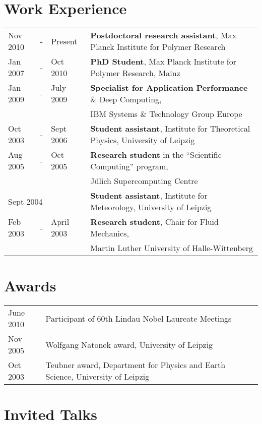 \documentclass{article}
\begin{document}
\section*{Work Experience}
\begin{tabular}{lcll}
Nov 2010 &-& Present & \textbf{Postdoctoral research assistant}, Max Planck Institute for Polymer Research\\
Jan 2007 &-& Oct 2010 & \textbf{PhD Student}, Max Planck Institute for Polymer Research, Mainz\\
Jan 2009 &-& July 2009 & \textbf{Specialist for Application Performance} \& Deep Computing,\\
&&&IBM Systems \& Technology Group Europe \\
Oct 2003 &-& Sept 2006 & \textbf{Student assistant}, Institute for Theoretical Physics, University of Leipzig \\
Aug 2005 &-& Oct 2005 & \textbf{Research student} in the ``Scientific Computing'' program,\\
&&& J{\"u}lich Supercomputing Centre \\
\multicolumn{3}{l}{Sept 2004} & \textbf{Student assistant}, Institute for Meteorology, University of Leipzig \\
Feb 2003 &-& April 2003 & \textbf{Research student}, Chair for Fluid Mechanics,\\
&&&Martin Luther University of Halle-Wittenberg \\
\end{tabular}

\section*{Awards}

\begin{tabular}{ll}
June 2010 & Participant of 60th Lindau Nobel Laureate Meetings\\
Nov 2005  & Wolfgang Natonek award, University of Leipzig\\
Oct 2003  & Teubner award, Department for Physics and Earth Science, University of Leipzig\\
\end{tabular}

\section*{Invited Talks}
\end{document}
